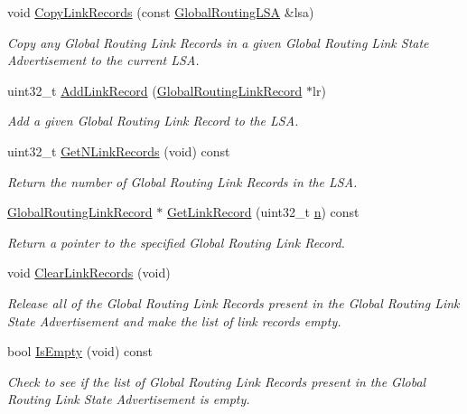 \begin{DoxyCompactItemize}
void \hyperlink{classns3_1_1GlobalRoutingLSA_ad8775b6edb27265dd462db55cf147c51}{Copy\+Link\+Records} (const \hyperlink{classns3_1_1GlobalRoutingLSA}{Global\+Routing\+L\+SA} \&lsa)
\begin{DoxyCompactList}\small\item\em Copy any Global Routing Link Records in a given Global Routing Link State Advertisement to the current L\+SA. \end{DoxyCompactList}\item 
uint32\+\_\+t \hyperlink{classns3_1_1GlobalRoutingLSA_a2b2bdf9b121a61fe793c88ab216f4fb9}{Add\+Link\+Record} (\hyperlink{classns3_1_1GlobalRoutingLinkRecord}{Global\+Routing\+Link\+Record} $\ast$lr)
\begin{DoxyCompactList}\small\item\em Add a given Global Routing Link Record to the L\+SA. \end{DoxyCompactList}\item 
uint32\+\_\+t \hyperlink{classns3_1_1GlobalRoutingLSA_a49043980a9d54ce4125cab4dbdba5a5c}{Get\+N\+Link\+Records} (void) const 
\begin{DoxyCompactList}\small\item\em Return the number of Global Routing Link Records in the L\+SA. \end{DoxyCompactList}\item 
\hyperlink{classns3_1_1GlobalRoutingLinkRecord}{Global\+Routing\+Link\+Record} $\ast$ \hyperlink{classns3_1_1GlobalRoutingLSA_a5671504b3ec9f9bab1a7784be3221c4d}{Get\+Link\+Record} (uint32\+\_\+t \hyperlink{lte__link__budget__x2__handover__measures_8m_abdb05bc5a064cf642a06c83b3392f148}{n}) const 
\begin{DoxyCompactList}\small\item\em Return a pointer to the specified Global Routing Link Record. \end{DoxyCompactList}\item 
void \hyperlink{classns3_1_1GlobalRoutingLSA_ab4ffe9bd37e80cba4f45025ec791bf41}{Clear\+Link\+Records} (void)
\begin{DoxyCompactList}\small\item\em Release all of the Global Routing Link Records present in the Global Routing Link State Advertisement and make the list of link records empty. \end{DoxyCompactList}\item 
bool \hyperlink{classns3_1_1GlobalRoutingLSA_af34e16b937c81ac26bf6b41ce0ff2509}{Is\+Empty} (void) const 
\begin{DoxyCompactList}\small\item\em Check to see if the list of Global Routing Link Records present in the Global Routing Link State Advertisement is empty. \end{DoxyCompactList}\item 

\end{DoxyCompactItemize}
